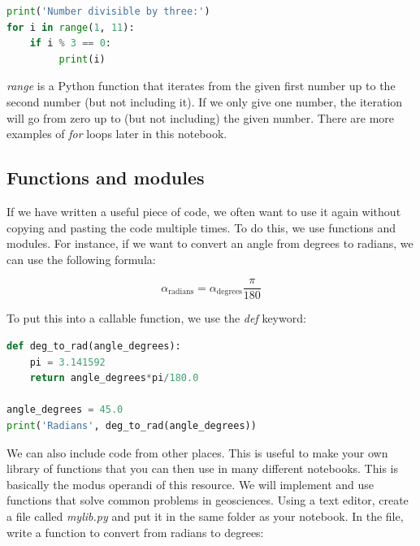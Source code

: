 \documentclass[a4paper , 12pt]{book}
\begin{document}
\begin{center}
\begin {lstlisting}[language=Python, frame=single]
print('Number divisible by three:')
for i in range(1, 11):
    if i %
         print(i)
\end{lstlisting}
\end{center}

\textit{range} is a Python function that iterates from the given first number up to the second number (but not including it). If we only give one number, the iteration will go from zero up to (but not including) the given number. There are more examples of \textit{for} loops later in this notebook.

\subsection{Functions and modules}

If we have written a useful piece of code, we often want to use it again without copying and pasting the code multiple times. To do this, we use functions and modules. For instance, if we want to convert an angle from degrees to radians, we can use the following formula: 

\begin{equation}
    \alpha_\text{radians} = \alpha_\text{degrees}\frac{\pi}{180}
\end{equation}    

To put this into a callable function, we use the \textit{def} keyword:

\begin{center}
\begin {lstlisting}[language=Python, frame=single]
def deg_to_rad(angle_degrees):
    pi = 3.141592
    return angle_degrees*pi/180.0

angle_degrees = 45.0
print('Radians', deg_to_rad(angle_degrees))
\end{lstlisting}
\end{center}

We can also include code from other places. This is useful to make your own library of functions that you can then use in many different notebooks. This is basically the modus operandi of this resource. We will implement and use functions that solve common problems in geosciences. Using a text editor, create a file called \textit{mylib.py} and put it in the same folder as your notebook. In the file, write a function to convert from radians to degrees:
\end{document}
